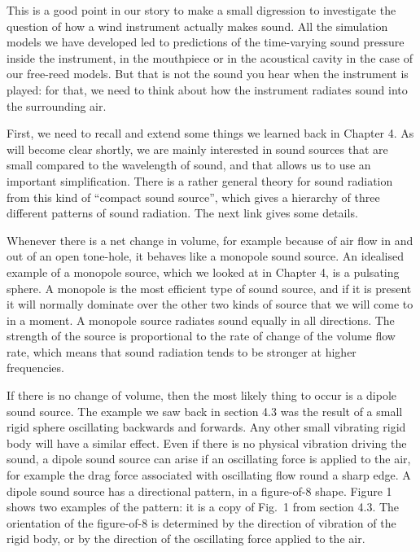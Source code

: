 

  This is a good point in our story to make a small digression to investigate 
  the question of how a wind instrument actually makes sound. All the 
  simulation models we have developed led to predictions of the time-varying 
  sound pressure inside the instrument, in the mouthpiece or in the acoustical 
  cavity in the case of our free-reed models. But that is not the sound you 
  hear when the instrument is played: for that, we need to think about how the 
  instrument radiates sound into the surrounding air. 

  First, we need to recall and extend some things we learned back in Chapter 4. 
  As will become clear shortly, we are mainly interested in sound sources that 
  are small compared to the wavelength of sound, and that allows us to use an 
  important simplification. There is a rather general theory for sound 
  radiation from this kind of “compact sound source”, which gives a hierarchy 
  of three different patterns of sound radiation. The next link gives some 
  details. 

  Whenever there is a net change in volume, for example because of air flow in 
  and out of an open tone-hole, it behaves like a monopole sound source. An 
  idealised example of a monopole source, which we looked at in Chapter 4, is a 
  pulsating sphere. A monopole is the most efficient type of sound source, and 
  if it is present it will normally dominate over the other two kinds of source 
  that we will come to in a moment. A monopole source radiates sound equally in 
  all directions. The strength of the source is proportional to the rate of 
  change of the volume flow rate, which means that sound radiation tends to be 
  stronger at higher frequencies. 

  If there is no change of volume, then the most likely thing to occur is a 
  dipole sound source. The example we saw back in section 4.3 was the result of 
  a small rigid sphere oscillating backwards and forwards. Any other small 
  vibrating rigid body will have a similar effect. Even if there is no physical 
  vibration driving the sound, a dipole sound source can arise if an 
  oscillating force is applied to the air, for example the drag force 
  associated with oscillating flow round a sharp edge. A dipole sound source 
  has a directional pattern, in a figure-of-8 shape. Figure 1 shows two 
  examples of the pattern: it is a copy of Fig.\ 1 from section 4.3. The 
  orientation of the figure-of-8 is determined by the direction of vibration of 
  the rigid body, or by the direction of the oscillating force applied to the 
  air. 

